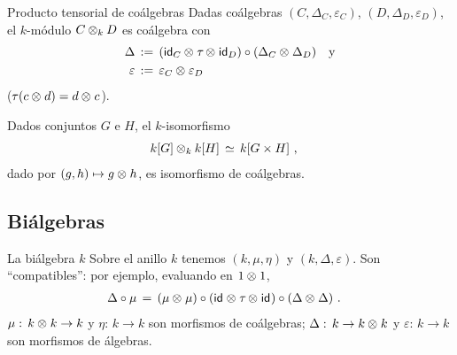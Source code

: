 \begin{frame}{Producto tensorial de co\'{a}lgebras}
	Dadas co\'{a}lgebras $(C,\Delta_C,\varepsilon_C)$,
	$(D,\Delta_D,\varepsilon_D)$, el $k$-m\'{o}dulo $C\tensor[k]D$ es
	co\'{a}lgebra con
	\begin{align*}
		\Delta & \,:=\,(\id[C]\tensor\swap\tensor\id[D])\circ
			(\Delta_C\tensor\Delta_D) \quad\text{y} \\
		\varepsilon & \,:=\,\varepsilon_C\tensor\varepsilon_D
	\end{align*}
	($\tau(c\tensor d)=d\tensor c$).
	\begin{ejemploCoalgebraProductoTensorial}%
		\label{ejemplo:coalgebraproductotensorial}
		Dados conjuntos $G$ e $H$, el $k$-isomorfismo
		\begin{align*}
			k[G]\tensor[k]k[H] & \,\simeq\, k[G\times H]
			\text{ ,}
		\end{align*}
		dado por $(g,h)\mapsto g\tensor h$, es isomorfismo de
		co\'{a}lgebras.
	\end{ejemploCoalgebraProductoTensorial}
\end{frame}

\subsection{Bi\'{a}lgebras}

\begin{frame}{La bi\'{a}lgebra $k$}
	Sobre el anillo $k$ tenemos $(k,\mu,\eta)$ y $(k,\Delta,\varepsilon)$.
	Son ``compatibles'': por ejemplo, evaluando en $1\tensor 1$,
	\begin{align*}
		\Delta\circ\mu & \,=\,
			(\mu\tensor\mu)\circ (\id\tensor\swap\tensor\id)\circ
				(\Delta\tensor\Delta)
		\text{ .}
	\end{align*}
	$\mu:\,k\tensor k\rightarrow k$ y $\eta:\,k\rightarrow k$ son morfismos
	de co\'{a}lgebras; $\Delta:\,k\rightarrow k\tensor k$ y
	$\varepsilon:\,k\rightarrow k$ son morfismos de \'{a}lgebras.
\end{frame}

